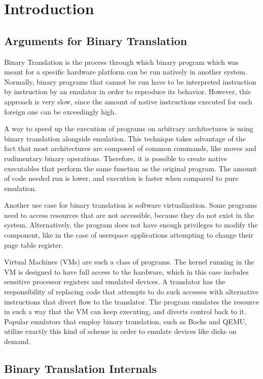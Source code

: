 \section{Introduction}

\subsection{Arguments for Binary Translation}

Binary Translation is the process through which binary program which was meant for a
specific hardware platform can be run natively in another system.  Normally, binary
programs that cannot be run have to be interpreted instruction by instruction
by an emulator in order to reproduce its behavior.  However, this approach is
very slow, since the amount of native instructions executed for each foreign
one can be exceedingly high.

A way to speed up the execution of programs on arbitrary architectures is using
binary translation alongside emulation.  This technique takes advantage of the
fact that most architectures are composed of common commands, like moves and
rudimentary binary operations.  Therefore, it is possible to create native
executables that perform the same function as the original program.  The amount
of code needed run is lower, and execution is faster when compared to pure emulation.

Another use case for binary translation is software virtualization.  Some
programs need to access resources that are not accessible, because they do not
exist in the system.  Alternatively, the program does not have enough
privileges to modify the component, like in the case of userspace applications
attempting to change their page table register.

Virtual Machines (VMs) are such a class of programs.  The kernel running in the
VM is designed to have full access to the hardware, which in this case includes
sensitive processor registers and emulated devices.  A translator has the
responsibility of replacing code that attempts to do such accesses with
alternative instructions that divert flow to the translator.  The program
emulates the resource in such a way that the VM can keep executing, and diverts
control back to it.  Popular emulators that employ binary translation, such as
Bochs\cite{lawton1996bochs} and QEMU\cite{bellard2005qemu}, utilize exactly this kind of scheme in order to emulate devices
like disks on demand.

\subsection{Binary Translation Internals}

